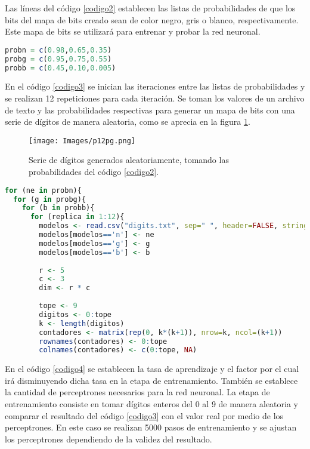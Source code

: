 \documentclass{report}
\begin{document}
Las l\'ineas del c\'odigo \ref{codigo2} establecen las listas de probabilidades de que los bits del mapa de bits creado sean de color negro, gris o blanco, respectivamente. Este mapa de bits se utilizar\'a para entrenar y probar la red neuronal.

\begin{lstlisting}[caption={Probabilidades de Negro, Gris y Blanco}, label=codigo2, language=R]
probn = c(0.98,0.65,0.35)
probg = c(0.95,0.75,0.55)
probb = c(0.45,0.10,0.005)
\end{lstlisting}

En el c\'odigo \ref{codigo3} se inician las iteraciones entre las listas de probabilidades y se realizan 12 repeticiones para cada iteraci\'on. Se toman los valores de un archivo de texto y las probabilidades respectivas para generar un mapa de bits con una serie de d\'igitos de manera aleatoria, como se aprecia en la figura \ref{fig1}.

\begin{figure}
    \centering
    \texttt{[image: Images/p12pg.png]}
    \caption{Serie de d\'igitos generados aleatoriamente, tomando las probabilidades del c\'odigo \ref{codigo2}.}
    \label{fig1}
\end{figure}

\begin{lstlisting}[caption=Generaci\'on del Mapa de Bits de los D\'igitos, label=codigo3, language=R]
for (ne in probn){
  for (g in probg){
    for (b in probb){
      for (replica in 1:12){
        modelos <- read.csv("digits.txt", sep=" ", header=FALSE, stringsAsFactors=F)
        modelos[modelos=='n'] <- ne
        modelos[modelos=='g'] <- g
        modelos[modelos=='b'] <- b
        
        r <- 5
        c <- 3
        dim <- r * c
        
        tope <- 9
        digitos <- 0:tope
        k <- length(digitos)
        contadores <- matrix(rep(0, k*(k+1)), nrow=k, ncol=(k+1))
        rownames(contadores) <- 0:tope
        colnames(contadores) <- c(0:tope, NA)
\end{lstlisting}

En el c\'odigo \ref{codigo4} se establecen la tasa de aprendizaje y el factor por el cual ir\'a disminuyendo dicha tasa en la etapa de entrenamiento. Tambi\'en se establece la cantidad de perceptrones necesarios para la red neuronal. La etapa de entrenamiento consiste en tomar d\'igitos enteros del 0 al 9 de manera aleatoria y comparar el resultado del c\'odigo \ref{codigo3} con el valor real por medio de los perceptrones. En este caso se realizan 5000 pasos de entrenamiento y se ajustan los perceptrones dependiendo de la validez del resultado.
\end{document}
